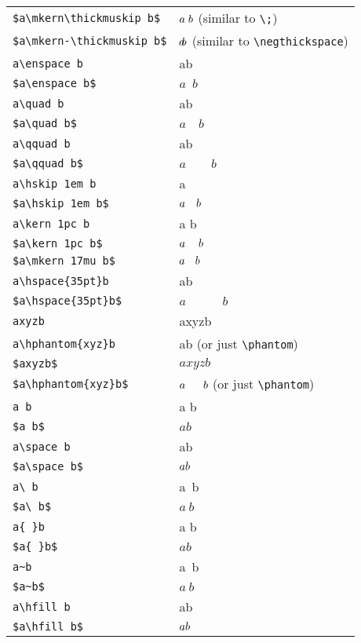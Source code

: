 \begin{tabular}{lp{5cm}}
  \verb|$a\mkern\thickmuskip b$|  & $a\mkern\thickmuskip b$ (similar to \verb|\;|) \\
  \verb|$a\mkern-\thickmuskip b$| & $a\mkern-\thickmuskip b$ (similar to \verb|\negthickspace|) \\
  \verb|a\enspace b|              & a\enspace b \\
  \verb|$a\enspace b$|            & $a\enspace b$ \\
  \verb|a\quad b|                 & a\quad b \\
  \verb|$a\quad b$|               & $a\quad b$ \\
  \verb|a\qquad b|                & a\qquad b \\
  \verb|$a\qquad b$|              & $a\qquad b$ \\
  \verb|a\hskip 1em b|            & a\hskip 1em b \\
  \verb|$a\hskip 1em b$|          & $a\hskip 1em b$ \\
  \verb|a\kern 1pc b|             & a\kern 1pc b \\
  \verb|$a\kern 1pc b$|           & $a\kern 1pc b$ \\
  \verb|$a\mkern 17mu b$|         & $a\mkern 17mu b$ \\
  \verb|a\hspace{35pt}b|          & a\hspace{35pt}b \\
  \verb|$a\hspace{35pt}b$|        & $a\hspace{35pt}b$ \\
  \verb|axyzb|                    & axyzb \\
  \verb|a\hphantom{xyz}b|         & a\hphantom{xyz}b (or just \verb|\phantom|) \\
  \verb|$axyzb$|                  & $axyzb$ \\
  \verb|$a\hphantom{xyz}b$|       & $a\hphantom{xyz}b$ (or just \verb|\phantom|) \\
  \verb|a b|                      & a b \\
  \verb|$a b$|                    & $a b$ \\
  \verb|a\space b|                & a\space b \\
  \verb|$a\space b$|              & $a\space b$ \\
  \verb|a\ b|                     & a\ b \\
  \verb|$a\ b$|                   & $a\ b$ \\
  \verb|a{ }b|                    & a{ }b \\
  \verb|$a{ }b$|                  & $a{ }b$ \\
  \verb|a~b|                      & a~b \\
  \verb|$a~b$|                    & $a~b$ \\
  \verb|a\hfill b|                & a\hfill b \\
  \verb|$a\hfill b$|              & $a\hfill b$
\end{tabular}

\begin{align*}
\end{align*}

\begin{equation}
\end{equation}

\begin{enumerate}
\end{enumerate}
